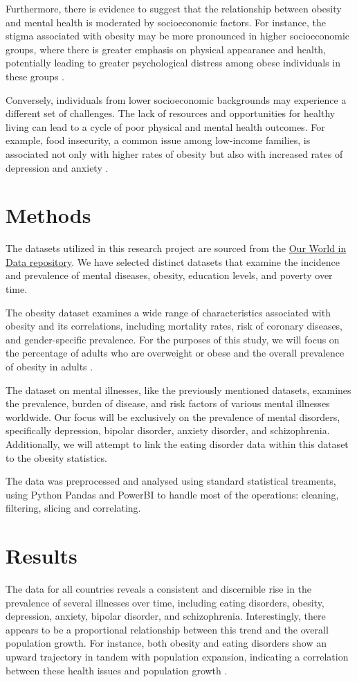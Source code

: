 \documentclass[runningheads]{llncs}
\begin{document}
Furthermore, there is evidence to suggest that the relationship between obesity and mental health is moderated by socioeconomic factors. For instance, the stigma associated with obesity may be more pronounced in higher socioeconomic groups, where there is greater emphasis on physical appearance and health, potentially leading to greater psychological distress among obese individuals in these groups \cite{Puhl2009}.

Conversely, individuals from lower socioeconomic backgrounds may experience a different set of challenges. The lack of resources and opportunities for healthy living can lead to a cycle of poor physical and mental health outcomes. For example, food insecurity, a common issue among low-income families, is associated not only with higher rates of obesity but also with increased rates of depression and anxiety \cite{Laraia2013}.

\section{Methods}

The datasets utilized in this research project are sourced from the \href{https://ourworldindata.org/}{Our World in Data repository}. We have selected distinct datasets that examine the incidence and prevalence of mental diseases, obesity, education levels, and poverty over time.

The obesity dataset examines a wide range of characteristics associated with obesity and its correlations, including mortality rates, risk of coronary diseases, and gender-specific prevalence. For the purposes of this study, we will focus on the percentage of adults who are overweight or obese and the overall prevalence of obesity in adults \cite{Obesity}.

The dataset on mental illnesses, like the previously mentioned datasets, examines the prevalence, burden of disease, and risk factors of various mental illnesses worldwide. Our focus will be exclusively on the prevalence of mental disorders, specifically depression, bipolar disorder, anxiety disorder, and schizophrenia. Additionally, we will attempt to link the eating disorder data within this dataset to the obesity statistics\cite{MentalHealth}.

The data was preprocessed and analysed using standard statistical treaments, using Python Pandas and PowerBI to handle most of the operations: cleaning, filtering, slicing and correlating. 

\section{Results}
The data for all countries reveals a consistent and discernible rise in the prevalence of several illnesses over time, including eating disorders, obesity, depression, anxiety, bipolar disorder, and schizophrenia. Interestingly, there appears to be a proportional relationship between this trend and the overall population growth. For instance, both obesity and eating disorders show an upward trajectory in tandem with population expansion, indicating a correlation between these health issues and population growth \cite{jeatdisord2019,cambridge2020}.
\end{document}
